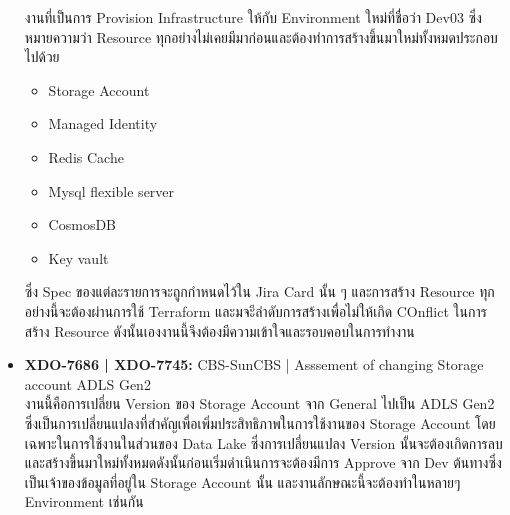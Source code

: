 \begin{itemize}
            งานที่เป็นการ Provision Infrastructure ให้กับ Environment ใหม่ที่ชื่อว่า Dev03 ซึ่งหมายความว่า Resource ทุกอย่างไม่เคยมีมาก่อนและต้องทำการสร้างขึ้นมาใหม่ทั้งหมดประกอบไปด้วย
            \begin{itemize}
                  \item Storage Account
                  \item Managed Identity
                  \item Redis Cache
                  \item Mysql flexible server
                  \item CosmosDB
                  \item Key vault
            \end{itemize}
            ซึ่ง Spec ของแต่ละรายการจะถูกกำหนดไว้ใน Jira Card นั้น ๆ และการสร้าง Resource ทุกอย่างนี้จะต้องผ่านการใช้ Terraform และมจะีลำดับการสร้างเพื่อไม่ให้เกิด COnflict ในการสร้าง Resource ดังนั้นเองงานนี้จึงต้องมีความเข้าใจและรอบคอบในการทำงาน
      \item \textbf{XDO-7686 | XDO-7745:} CBS-SunCBS | Asssement of changing Storage account ADLS Gen2\\
            งานนี้คือการเปลี่ยน Version ของ Storage Account จาก General ไปเป็น ADLS Gen2 ซึ่งเป็นการเปลี่ยนแปลงที่สำคัญเพื่อเพิ่มประสิทธิภาพในการใช้งานของ Storage Account โดยเฉพาะในการใช้งานในส่วนของ Data Lake ซึ่งการเปลี่ยนแปลง Version นั้นจะต้องเกิดการลบและสร้างขึ้นมาใหม่ทั้งหมดดังนั้นก่อนเริ่มดำเนินการจะต้องมีการ Approve จาก Dev ต้นทางซึ่งเป็นเจ้าของข้อมูลที่อยู่ใน Storage Account นั้น และงานลักษณะนี้จะต้องทำในหลายๆ Environment เช่นกัน
\end{itemize}

